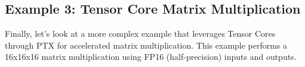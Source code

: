 \subsection{Example 3: Tensor Core Matrix Multiplication}

Finally, let's look at a more complex example that leverages Tensor Cores through PTX for accelerated matrix multiplication. This example performs a 16x16x16 matrix multiplication using FP16 (half-precision) inputs and outputs.

